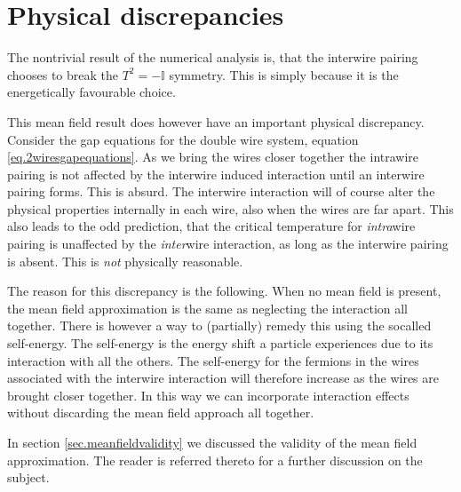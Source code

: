 \section{Physical discrepancies} \label{sec.physicaldiscrepancies}
The nontrivial result of the numerical analysis is, that the interwire pairing chooses to break the $T^2 = -\mathbb{I}$ symmetry. This is simply because it is the energetically favourable choice. 

This mean field result does however have an important physical discrepancy. Consider the gap equations for the double wire system, equation \eqref{eq.2wiresgapequations}. As we bring the wires closer together the intrawire pairing is not affected by the interwire induced interaction until an interwire pairing forms. This is absurd. The interwire interaction will of course alter the physical properties internally in each wire, also when the wires are far apart. This also leads to the odd prediction, that the critical temperature for \textit{intra}wire pairing is unaffected by the \textit{inter}wire interaction, as long as the interwire pairing is absent. This is \textit{not} physically reasonable. 

The reason for this discrepancy is the following. When no mean field is present, the mean field approximation is the same as neglecting the interaction all together. There is however a way to (partially) remedy this using the socalled self-energy. The self-energy is the energy shift a particle experiences due to its interaction with all the others. The self-energy for the fermions in the wires associated with the interwire interaction will therefore increase as the wires are brought closer together. In this way we can incorporate interaction effects without discarding the mean field approach all together. 

In section \ref{sec.meanfieldvalidity} we discussed the validity of the mean field approximation. The reader is referred thereto for a further discussion on the subject. 

